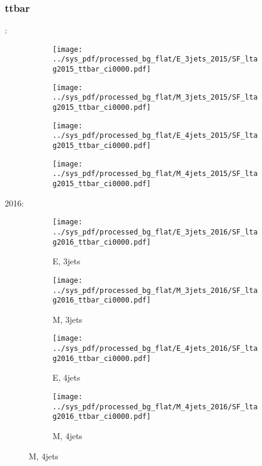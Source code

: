 \documentclass{beamer}
\begin{document}
\begin{frame}
\frametitle{ttbar}
\fontsize{5}{1}:
\begin{figure}
\centering
\begin{subfigure}[b]{0.24\textwidth}
\texttt{[image: ../sys\_pdf/processed\_bg\_flat/E\_3jets\_2015/SF\_ltag2015\_ttbar\_ci0000.pdf]}
\end{subfigure}
\begin{subfigure}[b]{0.24\textwidth}
\texttt{[image: ../sys\_pdf/processed\_bg\_flat/M\_3jets\_2015/SF\_ltag2015\_ttbar\_ci0000.pdf]}
\end{subfigure}
\begin{subfigure}[b]{0.24\textwidth}
\texttt{[image: ../sys\_pdf/processed\_bg\_flat/E\_4jets\_2015/SF\_ltag2015\_ttbar\_ci0000.pdf]}
\end{subfigure}
\begin{subfigure}[b]{0.24\textwidth}
\texttt{[image: ../sys\_pdf/processed\_bg\_flat/M\_4jets\_2015/SF\_ltag2015\_ttbar\_ci0000.pdf]}
\end{subfigure}
\end{figure}
2016:
\begin{figure}
\centering
\begin{subfigure}[b]{0.24\textwidth}
\texttt{[image: ../sys\_pdf/processed\_bg\_flat/E\_3jets\_2016/SF\_ltag2016\_ttbar\_ci0000.pdf]}
\captionsetup{font=tiny}
\caption{E, 3jets}
\end{subfigure}
\begin{subfigure}[b]{0.24\textwidth}
\texttt{[image: ../sys\_pdf/processed\_bg\_flat/M\_3jets\_2016/SF\_ltag2016\_ttbar\_ci0000.pdf]}
\captionsetup{font=tiny}
\caption{M, 3jets}
\end{subfigure}
\begin{subfigure}[b]{0.24\textwidth}
\texttt{[image: ../sys\_pdf/processed\_bg\_flat/E\_4jets\_2016/SF\_ltag2016\_ttbar\_ci0000.pdf]}
\captionsetup{font=tiny}
\caption{E, 4jets}
\end{subfigure}
\begin{subfigure}[b]{0.24\textwidth}
\texttt{[image: ../sys\_pdf/processed\_bg\_flat/M\_4jets\_2016/SF\_ltag2016\_ttbar\_ci0000.pdf]}
\captionsetup{font=tiny}
\caption{M, 4jets}
\end{subfigure}
\end{figure}
\end{frame}
\end{document}
